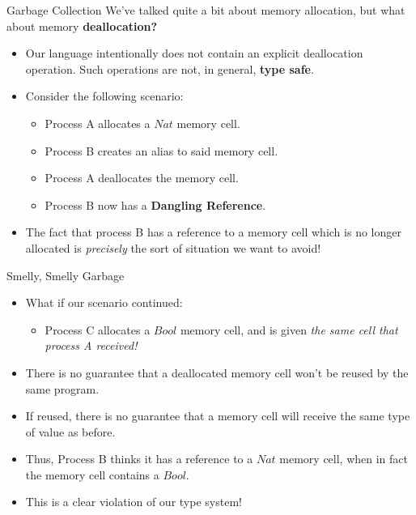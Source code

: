 \documentclass[11pt]{beamer}
\begin{document}
\begin{frame}[fragile=singleslide]{Garbage Collection}
We've talked quite a bit about memory allocation, but what about memory \textbf{deallocation?}
\begin{itemize}
\item Our language intentionally does not contain an explicit deallocation operation.  Such operations are not, in general, \textbf{type safe}.
\item Consider the following scenario:
\begin{itemize}
\item Process A allocates a $Nat$ memory cell.
\item Process B creates an alias to said memory cell.
\item Process A deallocates the memory cell.
\item Process B now has a \textbf{Dangling Reference}. 
\end{itemize}
\item The fact that process B has a reference to a memory cell which is no longer allocated is \emph{precisely} the sort of situation we want to avoid!
\end{itemize}
\end{frame}


\begin{frame}[fragile=singleslide]{Smelly, Smelly Garbage}
\begin{itemize}
\item What if our scenario continued:
\begin{itemize}
\item Process C allocates a $Bool$ memory cell, and is given \emph{the same cell that process A received!}
\end{itemize}
\item There is no guarantee that a deallocated memory cell won't be reused by the same program.
\item If reused, there is no guarantee that a memory cell will receive the same type of value as before.  
\item Thus, Process B thinks it has a reference to a $Nat$ memory cell, when in fact the memory cell contains a $Bool$.
\item This is a clear violation of our type system! 
\end{itemize}
\end{frame}
\end{document}
